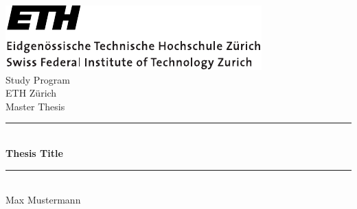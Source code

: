 \documentclass[pdftex,12pt,a4paper,twoside]{book}
\newcommand{\HRule}{\rule{\linewidth}{0.5mm}}
\begin{document}
\begin{titlepage}

\sffamily

\begin{center}

\includegraphics[left]{logos/ETHlogo.pdf}
\\[5cm]

{\Large Study Program}\\[0.5cm]
{\Large ETH Z{\"u}rich}\\[0.5cm]
{\Large Master Thesis}\\[2.5cm]

\HRule \\[0.4cm]
{ \huge \bfseries  Thesis Title}\\[0.4cm]

\HRule \\[1.5cm]

{\Large Max Mustermann}\\[2.5cm]

\vfill
\end{center}
\end{titlepage}
\pagestyle{empty}
\end{document}
